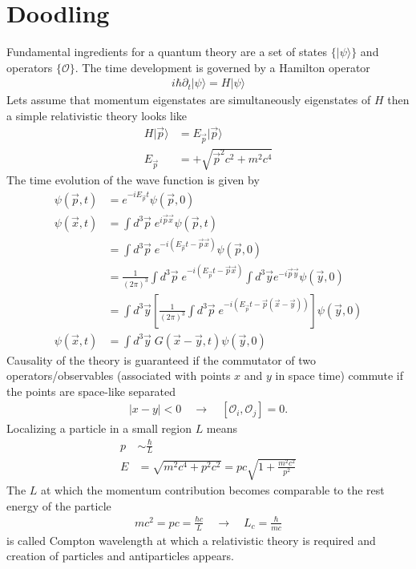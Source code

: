 \documentclass[10pt,a4paper]{article}
\theoremstyle{definition}
\begin{document}
\newpage
\section{Doodling}
Fundamental ingredients for a quantum theory are a set of states $\{|\psi\rangle\}$ and operators $\{\mathcal{O}\}$. The time development is governed by a Hamilton operator
\begin{align}
    i\hbar\partial_t|\psi\rangle=H|\psi\rangle
\end{align}
Lets assume that momentum eigenstates are simultaneously eigenstates of $H$ then a simple relativistic theory looks like
\begin{align}
    H|\vec{p}\rangle&= E_{\vec{p}}|\vec{p}\rangle\\
    E_{\vec{p}}&=+\sqrt{\vec{p}^2c^2+m^2c^4}
\end{align}
The time evolution of the wave function is given by
\begin{align}
    \psi(\vec{p},t) &= e^{-iE_{\vec{p}} t} \psi(\vec{p},0)\\
    \psi(\vec{x},t) &= \int d^3\vec{p}\;e^{i\vec{p}\vec{x}}\psi(\vec{p},t)\\
    &=\int d^3\vec{p}\;e^{-i(E_{\vec{p}} t-\vec{p}\vec{x})}\psi(\vec{p},0)\\
    &=\frac{1}{(2\pi)^3}\int d^3\vec{p}\;e^{-i(E_{\vec{p}} t-\vec{p}\vec{x})}\int d^3\vec{y}e^{-i\vec{p}\vec{y}}\psi(\vec{y},0)\\
    &=\int d^3\vec{y}\left[\frac{1}{(2\pi)^3}\int d^3\vec{p}\;e^{-i(E_{\vec{p}} t-\vec{p}(\vec{x}-\vec{y}))}\right]\psi(\vec{y},0)\\
    \psi(\vec{x},t) &= \int d^3\vec{y}\;G(\vec{x}-\vec{y},t) \psi(\vec{y},0)
\end{align}
Causality of the theory is guaranteed if the commutator of two operators/observables (associated with points $x$ and $y$ in space time) commute if the points are space-like separated
\begin{align}
    |x-y|<0\quad\rightarrow\quad [\mathcal{O}_i,\mathcal{O}_j]=0.
\end{align}
Localizing a particle in a small region $L$ means
\begin{align}
    p&\sim\frac{\hbar}{L}\\
    E&=\sqrt{m^2c^4+p^2c^2}= pc\sqrt{1+\frac{m^2c^2}{p^2}}
\end{align}
The $L$ at which the momentum contribution becomes comparable to the rest energy of the particle
\begin{align}
    mc^2=pc = \frac{\hbar c}{L}\quad\rightarrow\quad L_c=\frac{\hbar}{mc}
\end{align}
is called Compton wavelength at which a relativistic theory is required and creation of particles and antiparticles appears.
\end{document}
